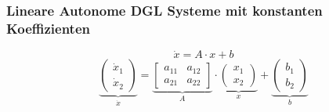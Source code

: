     \subsubsection{Lineare Autonome DGL Systeme mit konstanten Koeffizienten}
        \vspace{-0.5em}
        $$
            \dot{x} = A \cdot x + b
        $$
        \vspace{0em}
        $$
            \underbrace{\begin{pmatrix}
                \dot{x}_1\\ \dot{x}_2
            \end{pmatrix}}_{\dot{x}}
            =
            \underbrace{\begin{bmatrix}
                a_{11} & a_{12}\\ a_{21} & a_{22}
            \end{bmatrix}}_{A}
            \cdot
            \underbrace{\begin{pmatrix}
                x_1\\ x_2
            \end{pmatrix}}_{x}
            +
            \underbrace{\begin{pmatrix}
                b_1\\ b_2
            \end{pmatrix}}_{b}
        $$

